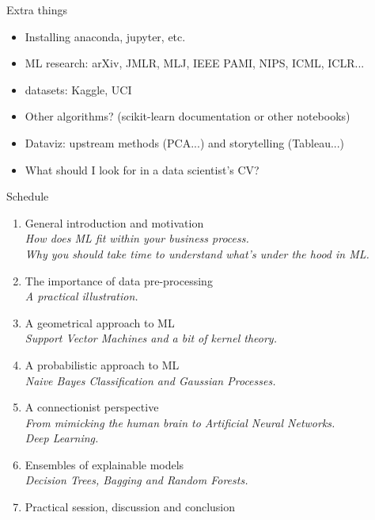 \documentclass{beamer}
\begin{document}
\begin{frame}{Extra things}
\begin{itemize}
\item Installing anaconda, jupyter, etc.
\item ML research: arXiv, JMLR, MLJ, IEEE PAMI, NIPS, ICML, ICLR...
\item datasets: Kaggle, UCI
\item Other algorithms? (scikit-learn documentation or other notebooks)
\item Dataviz: upstream methods (PCA...) and storytelling (Tableau...)
\item What should I look for in a data scientist's CV?
\end{itemize}
\end{frame}

\begin{frame}{Schedule}
\begin{enumerate}
\item General introduction and motivation \Checkmark \\
{\small \it How does ML fit within your business process.\\
Why you should take time to understand what's under the hood in ML.}
\item The importance of data pre-processing \Checkmark \\
{\small \it A practical illustration.}
\item A geometrical approach to ML \Checkmark \\
{\small \it Support Vector Machines and a bit of kernel theory.}
\item A probabilistic approach to ML \Checkmark \\
{\small \it Naive Bayes Classification and Gaussian Processes.}
\item A connectionist perspective \Checkmark \\
{\small \it From mimicking the human brain to Artificial Neural Networks.\\
Deep Learning.}
\item Ensembles of explainable models \Checkmark \\
{\small \it Decision Trees, Bagging and Random Forests.}
\item Practical session, discussion and conclusion \Checkmark
\end{enumerate}
\end{frame}
\end{document}
